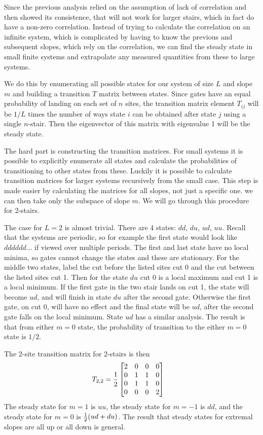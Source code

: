 Since the previous analysis relied on the assumption of lack of correlation and then showed its consistence, that will not work for larger stairs, which in fact do have a non-zero correlation. Instead of trying to calculate the correlation on an infinite system, which is complicated by having to know the previous and subsequent slopes, which rely on the correlation, we can find the steady state in small finite systems and extrapolate any measured quantities from these to large systems.

We do this by enumerating all possible states for our system of size $L$ and slope $m$ and building a transition $T$ matrix between states. Since gates have an equal probability of landing on each set of $n$ sites, the transition matrix element $T_{ij}$ will be $1/L$ times the number of ways state $i$ can be obtained after state $j$ using a single $n$-stair. Then the eigenvector of this matrix with eigenvalue 1 will be the steady state.

The hard part is constructing the transition matrices. For small systems it is possible to explicitly enumerate all states and calculate the probabilities of transitioning to other states from these. Luckily it is possible to calculate transition matrices for larger systems recursively from the small case. This step is made easier by calculating the matrices for all slopes, not just a specific one. we can then take only the subspace of slope $m$. We will go through this procedure for 2-stairs.

The case for $L=2$ is almost trivial. There are 4 states: $dd$, $du$, $ud$, $uu$. Recall that the systems are periodic, so for example the first state would look like $dddddd\dots$ if viewed over multiple periods. The first and last state have no local minima, so gates cannot change the states and these are stationary. For the middle two states, label the cut before the listed sites cut 0 and the cut between the listed sites cut 1. Then for the state $du$ cut 0 is a local maximum and cut 1 is a local minimum. If the first gate in the two stair lands on cut 1, the state will become $ud$, and will finish in state $du$ after the second gate. Otherwise the first gate, on cut 0, will have no effect and the final state will be $ud$, after the second gate falls on the local minimum. State $ud$ has a similar analysis. The result is that from either $m=0$ state, the probability of transition to the either $m=0$ state is $1/2$.

The 2-site transition matrix for 2-stairs is then 
\begin{align}
T_{2,2} &= 
\frac{1}{2} \begin{bmatrix}
	2 & 0 & 0 & 0 \\
	0 & 1 & 1 & 0 \\
	0 & 1 & 1 & 0 \\
	0 & 0 & 0 & 2
	\end{bmatrix}
\end{align}
The steady state for $m=1$ is $uu$, the steady state for $m=-1$ is $dd$, and the steady state for $m=0$ is $\frac{1}{2}(ud+du)$. The result that steady states for extremal slopes are all up or all down is general.

